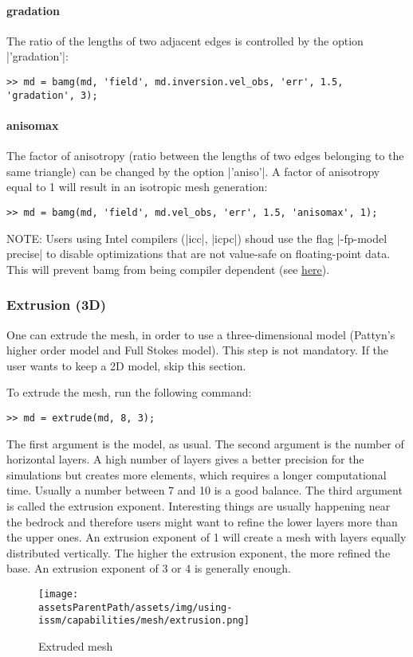 \paragraph{gradation}
The ratio of the lengths of two adjacent edges is controlled by the option \lstinlinebg|'gradation'|:
\begin{lstlisting}
>> md = bamg(md, 'field', md.inversion.vel_obs, 'err', 1.5, 'gradation', 3);
\end{lstlisting}

\paragraph{anisomax}
The factor of anisotropy (ratio between the lengths of two edges belonging to the same triangle) can be changed by the option \lstinlinebg|'aniso'|. A factor of anisotropy equal to 1 will result in an isotropic mesh generation:
\begin{lstlisting}
>> md = bamg(md, 'field', md.vel_obs, 'err', 1.5, 'anisomax', 1);
\end{lstlisting}
NOTE: Users using Intel compilers (\lstinlinebg|icc|, \lstinlinebg|icpc|) shoud use the flag \lstinlinebg|-fp-model precise| to disable optimizations that are not value-safe on floating-point data. This will prevent bamg from being compiler dependent (see \href{https://software.intel.com/en-us/node/522979}{here}).

\subsubsection{Extrusion (3D)}
One can extrude the mesh, in order to use a three-dimensional model (Pattyn's higher order model and Full Stokes model). This step is not mandatory. If the user wants to keep a 2D model, skip this section.

To extrude the mesh, run the following command:
\begin{lstlisting}
>> md = extrude(md, 8, 3);
\end{lstlisting}
The first argument is the model, as usual. The second argument is the number of horizontal layers. A high number of layers gives a better precision for the simulations but creates more elements, which requires a longer computational time. Usually a number between 7 and 10 is a good balance. The third argument is called the extrusion exponent. Interesting things are usually happening near the bedrock and therefore users might want to refine the lower layers more than the upper ones. An extrusion exponent of 1 will create a mesh with layers equally distributed vertically. The higher the extrusion exponent, the more refined the base. An extrusion exponent of 3 or 4 is generally enough.
\begin{figure}[H]
	\begin{center}
		\texttt{[image: \\assetsParentPath/assets/img/using-issm/capabilities/mesh/extrusion.png]}
		\caption{Extruded mesh}
	\end{center}
\end{figure}

\clearpage %
